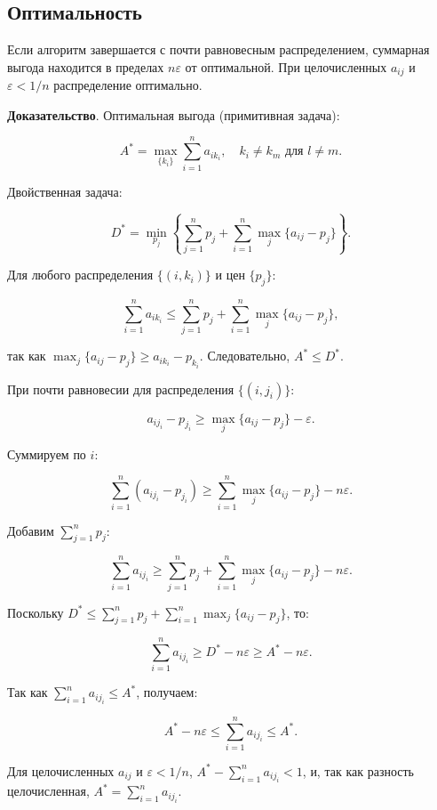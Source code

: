 \subsection{Оптимальность}
\begin{theorem}
\label{thm:auction_optimality}
Если алгоритм завершается с почти равновесным распределением, суммарная выгода находится в пределах $n \varepsilon$ от оптимальной. При целочисленных $a_{ij}$ и $\varepsilon < 1/n$ распределение оптимально.
\end{theorem}

\textbf{Доказательство}. Оптимальная выгода (примитивная задача):

\[
A^* = \max_{\{k_i\}} \sum_{i=1}^n a_{i k_i}, \quad k_i \neq k_m \text{ для } l \neq m.
\]

Двойственная задача:

\[
D^* = \min_{p_j} \left\{ \sum_{j=1}^n p_j + \sum_{i=1}^n \max_j \{a_{ij} - p_j\} \right\}.
\]

Для любого распределения $\{ (i, k_i) \}$ и цен $\{ p_j \}$:

\[
\sum_{i=1}^n a_{i k_i} \leq \sum_{j=1}^n p_j + \sum_{i=1}^n \max_j \{a_{ij} - p_j\},
\]

так как $\max_j \{a_{ij} - p_j\} \geq a_{i k_i} - p_{k_i}$. Следовательно, $A^* \leq D^*$.

При почти равновесии для распределения $\{ (i, j_i) \}$:

\[
a_{i j_i} - p_{j_i} \geq \max_j \{a_{ij} - p_j\} - \varepsilon.
\]

Суммируем по $i$:

\[
\sum_{i=1}^n (a_{i j_i} - p_{j_i}) \geq \sum_{i=1}^n \max_j \{a_{ij} - p_j\} - n \varepsilon.
\]

Добавим $\sum_{j=1}^n p_j$:

\[
\sum_{i=1}^n a_{i j_i} \geq \sum_{j=1}^n p_j + \sum_{i=1}^n \max_j \{a_{ij} - p_j\} - n \varepsilon.
\]

Поскольку $D^* \leq \sum_{j=1}^n p_j + \sum_{i=1}^n \max_j \{a_{ij} - p_j\}$, то:

\[
\sum_{i=1}^n a_{i j_i} \geq D^* - n \varepsilon \geq A^* - n \varepsilon.
\]

Так как $\sum_{i=1}^n a_{i j_i} \leq A^*$, получаем:

\[
A^* - n \varepsilon \leq \sum_{i=1}^n a_{i j_i} \leq A^*.
\]

Для целочисленных $a_{ij}$ и $\varepsilon < 1/n$, $A^* - \sum_{i=1}^n a_{i j_i} < 1$, и, так как разность целочисленная, $A^* = \sum_{i=1}^n a_{i j_i}$.

